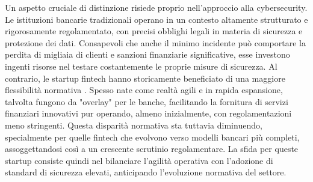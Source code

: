 Un aspetto cruciale di distinzione risiede proprio nell'approc\allowbreak{}cio alla cyber\allowbreak{}security.
Le istituzioni bancarie tradizionali operano in un contesto altamente strutturato e rigorosamente regolamentato, con precisi obblighi legali in materia di sicurezza e protezione dei dati.
Consapevoli che anche il minimo incidente può comportare la perdita di migliaia di clienti e sanzioni finanziarie significative, esse investono ingenti risorse nel testare costantemente le proprie misure di sicurezza.
Al contrario, le startup fintech hanno storicamente beneficiato di una maggiore flessibilità normativa \cite{bankingVsfintech}. Spesso nate come realtà agili e in rapida espansione, talvolta fungono da "overlay" per le banche, facilitando la fornitura di servizi finanziari innovativi pur operando, almeno inizialmente, con regolamentazioni meno stringenti. Questa disparità normativa sta tuttavia diminuendo, specialmente per quelle fintech che evolvono verso modelli bancari più completi, assoggettandosi così a un crescente scrutinio regolamentare. La sfida per queste startup consiste quindi nel bilanciare l'agilità operativa con l'adozione di standard di sicurezza elevati, anticipando l'evoluzione normativa del settore.
\newline

